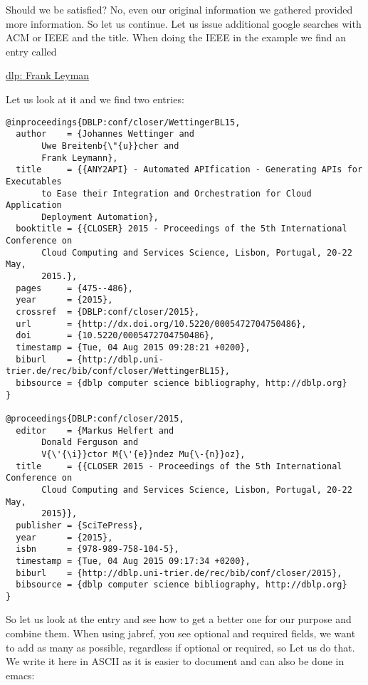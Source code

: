 Should we be satisfied? No, even our original information we gathered
provided more information. So let us continue. Let us issue additional
google searches with ACM or IEEE and the title. When doing the IEEE in the
example we find an entry called

\href{http://dblp.uni-trier.de\%2Fpers\%2Fl\%2FLeymann\%3AFrank\&usg=AFQjCNHCu-66qxWH0zRlPLr4DA8jIo5V-g\&sig2=1vYdnGOEiMcLBEMpbeBA7g}{dlp:
Frank Leyman}

Let us look at it and we find two entries:

\begin{verbatim}
@inproceedings{DBLP:conf/closer/WettingerBL15,
  author    = {Johannes Wettinger and
       Uwe Breitenb{\"{u}}cher and
       Frank Leymann},
  title     = {{ANY2API} - Automated APIfication - Generating APIs for Executables
       to Ease their Integration and Orchestration for Cloud Application
       Deployment Automation},
  booktitle = {{CLOSER} 2015 - Proceedings of the 5th International Conference on
       Cloud Computing and Services Science, Lisbon, Portugal, 20-22 May,
       2015.},
  pages     = {475--486},
  year      = {2015},
  crossref  = {DBLP:conf/closer/2015},
  url       = {http://dx.doi.org/10.5220/0005472704750486},
  doi       = {10.5220/0005472704750486},
  timestamp = {Tue, 04 Aug 2015 09:28:21 +0200},
  biburl    = {http://dblp.uni-trier.de/rec/bib/conf/closer/WettingerBL15},
  bibsource = {dblp computer science bibliography, http://dblp.org}
}

@proceedings{DBLP:conf/closer/2015,
  editor    = {Markus Helfert and
       Donald Ferguson and
       V{\'{\i}}ctor M{\'{e}}ndez Mu{\-{n}}oz},
  title     = {{CLOSER 2015 - Proceedings of the 5th International Conference on
       Cloud Computing and Services Science, Lisbon, Portugal, 20-22 May,
       2015}},
  publisher = {SciTePress},
  year      = {2015},
  isbn      = {978-989-758-104-5},
  timestamp = {Tue, 04 Aug 2015 09:17:34 +0200},
  biburl    = {http://dblp.uni-trier.de/rec/bib/conf/closer/2015},
  bibsource = {dblp computer science bibliography, http://dblp.org}
}
\end{verbatim}

So let us look at the entry and see how to get a better one for our
purpose and combine them. When using jabref, you see optional and
required fields, we want to add as many as possible, regardless if
optional or required, so Let us do that. We write it here in ASCII as it
is easier to document and can also be done in emacs:


